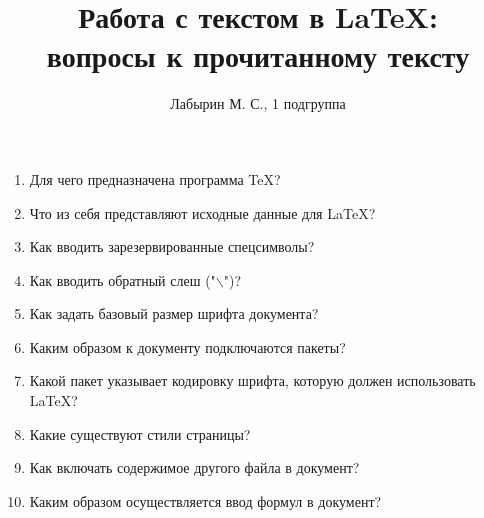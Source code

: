 \documentclass[a4paper,12pt]{article}
\author{Лабырин М. С., 1 подгруппа}
\title{Работа с текстом в \LaTeX{}:\\вопросы к прочитанному тексту}
\begin{document}
\maketitle

\begin{enumerate}
  \item Для чего предназначена программа \TeX{}?
  \item Что из себя представляют исходные данные для \LaTeX{}?
  \item Как вводить зарезервированные спецсимволы?
  \item Как вводить обратный слеш ("$\backslash$")?
  \item Как задать базовый размер шрифта документа?
  \item Каким образом к документу подключаются пакеты?
  \item Какой пакет указывает кодировку шрифта, которую должен использовать \LaTeX{}?
  \item Какие существуют стили страницы?
  \item Как включать содержимое другого файла в документ?
  \item Каким образом осуществляется ввод формул в документ?
\end{enumerate}
\end{document}
